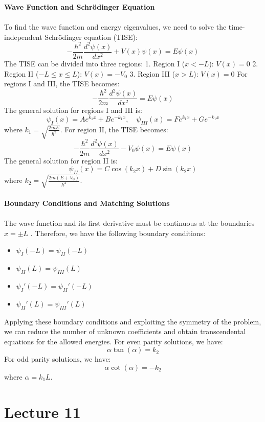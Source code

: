 \documentclass{article}
\begin{document}
\textbf{Wave Function and Schrödinger Equation}\\ \\
To find the wave function and energy eigenvalues, we need to solve the time-independent Schrödinger equation (TISE):
$$
-\frac{\hbar^2}{2m}\frac{d^2\psi(x)}{dx^2} + V(x)\psi(x) = E\psi(x)
$$
The TISE can be divided into three regions:
1. Region I ($x < -L$): $V(x) = 0$
2. Region II ($-L \leq x \leq L$): $V(x) = -V_0$
3. Region III ($x > L$): $V(x) = 0$
For regions I and III, the TISE becomes:
$$
-\frac{\hbar^2}{2m}\frac{d^2\psi(x)}{dx^2} = E\psi(x)
$$
The general solution for regions I and III is:
$$
\psi_I(x) = Ae^{k_1x} + Be^{-k_1x}, \quad \psi_{III}(x) = Fe^{k_1x} + Ge^{-k_1x}
$$
where $k_1 = \sqrt{\frac{2mE}{\hbar^2}}$.
For region II, the TISE becomes:
$$
-\frac{\hbar^2}{2m}\frac{d^2\psi(x)}{dx^2} - V_0\psi(x) = E\psi(x)
$$
The general solution for region II is:
$$
\psi_{II}(x) = C\cos(k_2x) + D\sin(k_2x)
$$
where $k_2 = \sqrt{\frac{2m(E + V_0)}{\hbar^2}}$. \\ \\
\textbf{Boundary Conditions and Matching Solutions}\\ \\
The wave function and its first derivative must be continuous at the boundaries $x = \pm L$ . Therefore, we have the following boundary conditions:\\
\begin{itemize}
    \item $\psi_I(-L) = \psi_{II}(-L) $
    \item $\psi_{II}(L) = \psi_{III}(L)$
    \item $\psi_I'(-L) = \psi_{II}'(-L)$
    \item $\psi_{II}'(L) = \psi_{III}'(L)$
    \end{itemize}
Applying these boundary conditions and exploiting the symmetry of the problem, we can reduce the number of unknown coefficients and obtain transcendental equations for the allowed energies. For even parity solutions, we have:
$$
\alpha\tan(\alpha) = k_2
$$
For odd parity solutions, we have:
$$
\alpha\cot(\alpha) = -k_2
$$
where $\alpha = k_1L$. 
\newpage
\section{ Lecture 11}
\end{document}

